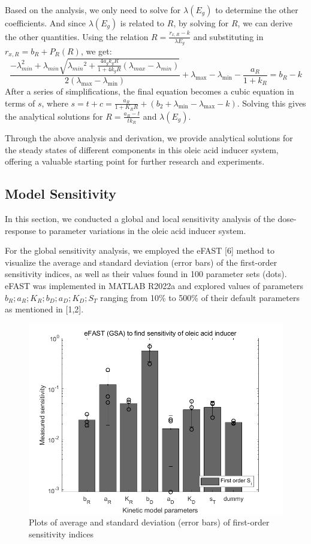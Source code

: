 \documentclass[UTF8]{article}
\begin{document}
Based on the analysis, we only need to solve for $\lambda\left(E_g\right)$ to determine the other coefficients. And since $\lambda\left(E_g\right)$ is related to $R$, by solving for $R$, we can derive the other quantities.
Using the relation $R=\frac{r_{x, R}-k}{\lambda E_g}$ and substituting in $r_{x, R}=b_R+P_R(R)$, we get:
$$
\frac{-\lambda_{min }^2+\lambda_{min} \sqrt{\lambda_{min }{ }^2+\frac{4 a_g k_g R}{1+4 k_ g R}(\lambda_{max} -\lambda_{min} )}}{2\left(\lambda_{\max }-\lambda_{\min }\right)}+\lambda_{\max }-\lambda_{\min } -\frac{a_R}{1+k_R}=b_R-k
$$
After a series of simplifications, the final equation becomes a cubic equation in terms of $s$, where $s=t+c=\frac{a_R}{1+K_R R}+\left(b_2+\lambda_{\min }-\lambda_{\max }-k\right)$. Solving this gives the analytical solutions for $R=\frac{a_R-t}{t k_R}$ and $\lambda\left(E_g\right)$.

Through the above analysis and derivation, we provide analytical solutions for the steady states of different components in this oleic acid inducer system, offering a valuable starting point for further research and experiments.

\subsection{Model Sensitivity}
In this section, we conducted a global and local sensitivity analysis of the dose-response to parameter variations in the oleic acid inducer system.

For the global sensitivity analysis, we employed the eFAST [6] method to visualize the average and standard deviation (error bars) of the first-order sensitivity indices, as well as their values found in 100 parameter sets (dots). eFAST was implemented in MATLAB R2022a and explored values of parameters $b_R; a_R; K_R; b_D; a_D; K_D;S_T$ ranging from 10\% to 500\% of their default parameters as mentioned in [1,2]. 
\begin{figure}[h]
	\centering
	\includegraphics[width=0.75\linewidth]{figures/GSA_sen.png}
	\caption{Plots of average and standard deviation (error bars) of first-order sensitivity indices}
	\label{fig:GSA_sen}
\end{figure}
\end{document}
